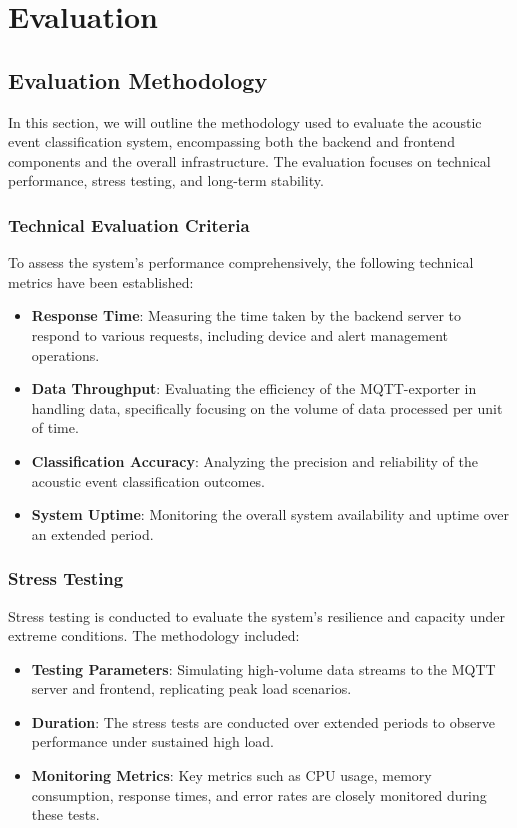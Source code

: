 \chapter{Evaluation}
\section{Evaluation Methodology}
In this section, we will outline the methodology used to evaluate the acoustic event classification system, encompassing both the backend and frontend components and the overall infrastructure. The evaluation focuses on technical performance, stress testing, and long-term stability.

\subsection{Technical Evaluation Criteria}
To assess the system's performance comprehensively, the following technical metrics have been established:

\begin{itemize}
  \item \textbf{Response Time}: Measuring the time taken by the backend server to respond to various requests, including device and alert management operations.
  \item \textbf{Data Throughput}: Evaluating the efficiency of the MQTT-exporter in handling data, specifically focusing on the volume of data processed per unit of time.
  \item \textbf{Classification Accuracy}: Analyzing the precision and reliability of the acoustic event classification outcomes.
  \item \textbf{System Uptime}: Monitoring the overall system availability and uptime over an extended period.
\end{itemize}
\subsection{Stress Testing}
Stress testing is conducted to evaluate the system's resilience and capacity under extreme conditions. The methodology included:

\begin{itemize}
  \item \textbf{Testing Parameters}: Simulating high-volume data streams to the MQTT server and frontend, replicating peak load scenarios.
  \item \textbf{Duration}: The stress tests are conducted over extended periods to observe performance under sustained high load.
  \item \textbf{Monitoring Metrics}: Key metrics such as CPU usage, memory consumption, response times, and error rates are closely monitored during these tests.
\end{itemize}

